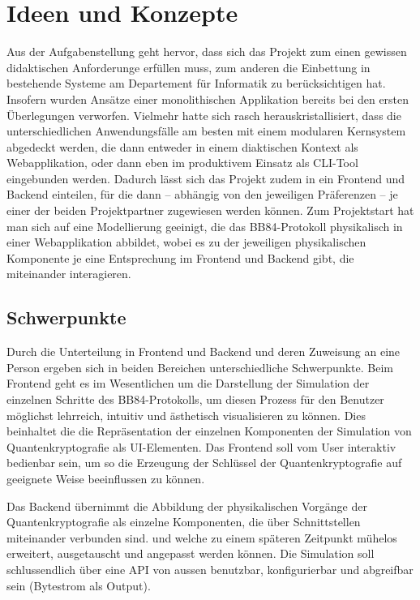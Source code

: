 \documentclass[a4paper,10.2pt,pdftex]{scrartcl}%
\begin{document}
\section{Ideen und Konzepte}
Aus der Aufgabenstellung geht hervor, dass sich das Projekt zum einen gewissen didaktischen Anforderunge erfüllen muss, zum anderen die Einbettung in bestehende Systeme am Departement für Informatik zu berücksichtigen hat. Insofern wurden Ansätze einer monolithischen Applikation bereits bei den ersten Überlegungen verworfen. Vielmehr hatte sich rasch herauskristallisiert, dass die unterschiedlichen Anwendungsfälle am besten mit einem modularen Kernsystem abgedeckt werden, die dann entweder in einem diaktischen Kontext als Webapplikation, oder dann eben im produktivem Einsatz als CLI-Tool eingebunden werden. Dadurch lässt sich das Projekt zudem in ein Frontend und Backend einteilen, für die dann -- abhängig von den jeweiligen Präferenzen --  je einer der beiden Projektpartner zugewiesen werden können. Zum Projektstart hat man sich auf eine Modellierung geeinigt, die das BB84-Protokoll physikalisch in einer Webapplikation abbildet, wobei es zu der jeweiligen physikalischen Komponente je eine Entsprechung im Frontend und Backend gibt, die miteinander interagieren. 

\subsection{Schwerpunkte}
Durch die Unterteilung in Frontend und Backend und deren Zuweisung an eine Person ergeben sich in beiden Bereichen unterschiedliche Schwerpunkte. Beim Frontend geht es im Wesentlichen um die Darstellung der Simulation der einzelnen Schritte des BB84-Protokolls, um diesen Prozess für den Benutzer möglichst lehrreich, intuitiv und ästhetisch visualisieren zu können. Dies beinhaltet die die Repräsentation der einzelnen Komponenten der Simulation von Quantenkryptografie als UI-Elementen. Das Frontend soll vom User interaktiv bedienbar sein, um so die Erzeugung der Schlüssel der Quantenkryptografie auf geeignete Weise beeinflussen zu können.

Das Backend übernimmt die Abbildung der physikalischen Vorgänge der Quantenkryptografie als einzelne Komponenten, die über Schnittstellen miteinander verbunden sind.  und welche zu einem späteren Zeitpunkt mühelos erweitert, ausgetauscht und angepasst werden können. Die Simulation soll schlussendlich über eine API von aussen benutzbar, konfigurierbar und abgreifbar sein (Bytestrom als Output).
\end{document}
